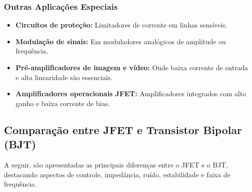 \documentclass[12pt]{article}
\begin{document}
\subsubsection{Outras Aplicações Especiais}

\begin{itemize}
    \item \textbf{Circuitos de proteção:} Limitadores de corrente em linhas sensíveis.
    \item \textbf{Modulação de sinais:} Em moduladores analógicos de amplitude ou frequência.
    \item \textbf{Pré-amplificadores de imagem e vídeo:} Onde baixa corrente de entrada e alta linearidade são essenciais.
    \item \textbf{Amplificadores operacionais JFET:} Amplificadores integrados com alto ganho e baixa corrente de bias.
\end{itemize}


\subsection{Comparação entre JFET e Transistor Bipolar (BJT)}

A seguir, são apresentadas as principais diferenças entre o JFET e o BJT, destacando aspectos de controle, impedância, ruído, estabilidade e faixa de frequência.
\end{document}
